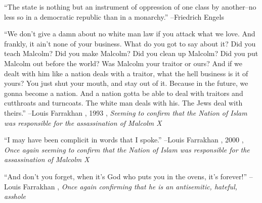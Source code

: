 \documentclass{article}%
\begin{document}
\linebreak%
\vspace{1mm}%
\begin{minipage}{\textwidth}%
\flushleft%
“The state is nothing but an instrument of oppression of one class by another–no less so in a democratic republic than in a monarchy.”%
\linebreak%
\vspace{1mm}%
–Friedrich Engels%
\linebreak%
\vspace{1mm}%
\end{minipage}%
\linebreak%
\vspace{1mm}%
\begin{minipage}{\textwidth}%
\flushleft%
“We don't give a damn about no white man law if you attack what we love. And frankly, it ain't none of your business. What do you got to say about it? Did you teach Malcolm? Did you make Malcolm? Did you clean up Malcolm? Did you put Malcolm out before the world? Was Malcolm your traitor or ours? And if we dealt with him like a nation deals with a traitor, what the hell business is it of yours? You just shut your mouth, and stay out of it. Because in the future, we gonna become a nation. And a nation gotta be able to deal with traitors and cutthroats and turncoats. The white man deals with his. The Jews deal with theirs.”%
\linebreak%
\vspace{1mm}%
–Louis Farrakhan%
, 1993%
, \textit{Seeming to confirm that the Nation of Islam was responsible for the assassination of Malcolm X}%
\linebreak%
\vspace{1mm}%
\end{minipage}%
\linebreak%
\vspace{1mm}%
\begin{minipage}{\textwidth}%
\flushleft%
“I may have been complicit in words that I spoke.”%
\linebreak%
\vspace{1mm}%
–Louis Farrakhan%
, 2000%
, \textit{Once again seeming to confirm that the Nation of Islam was responsible for the assassination of Malcolm X}%
\linebreak%
\vspace{1mm}%
\end{minipage}%
\linebreak%
\vspace{1mm}%
\begin{minipage}{\textwidth}%
\flushleft%
“And don't you forget, when it's God who puts you in the ovens, it's forever!”%
\linebreak%
\vspace{1mm}%
–Louis Farrakhan%
, \textit{Once again confirming that he is an antisemitic, hateful, asshole}%
\linebreak%
\vspace{1mm}%
\end{minipage}%
\end{document}
